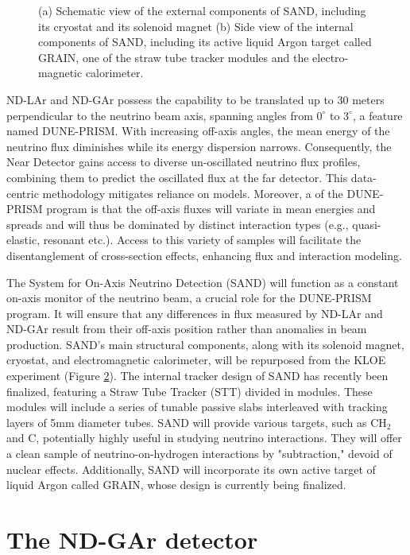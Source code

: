 \begin{figure}[t]
\begin{subfigure}[b]{0.48\textwidth}
         \caption{}
         \label{fig:SAND-inside}
     \end{subfigure}
        \caption{(a) Schematic view of the external components of SAND, including its cryostat and its solenoid magnet (b) Side view of the internal components of SAND, including its active liquid Argon target called GRAIN, one of the straw tube tracker modules and the electro-magnetic calorimeter.  }
        \label{fig:SAND-all}
\end{figure}

ND-LAr and ND-GAr possess the capability to be translated up to 30 meters perpendicular to the neutrino beam axis, spanning angles from $0^{\circ}$ to $3^{\circ}$, a feature named DUNE-PRISM. With increasing off-axis angles, the mean energy of the neutrino flux diminishes while its energy dispersion narrows. Consequently, the Near Detector gains access to diverse un-oscillated neutrino flux profiles, combining them to predict the oscillated flux at the far detector. This data-centric methodology mitigates reliance on models. Moreover, a  of the DUNE-PRISM program is that the off-axis fluxes will variate in mean energies and spreads and will thus be dominated by distinct interaction types (e.g., quasi-elastic, resonant etc.). Access to this variety of samples will facilitate the disentanglement of cross-section effects, enhancing flux and interaction modeling.


The System for On-Axis Neutrino Detection (SAND) will function as a constant on-axis monitor of the neutrino beam, a crucial role for the DUNE-PRISM program. It will ensure that any differences in flux measured by ND-LAr and ND-GAr result from their off-axis position rather than anomalies in beam production. SAND's main structural components, along with its solenoid magnet, cryostat, and electromagnetic calorimeter, will be repurposed from the KLOE experiment (Figure \ref{fig:SAND-all}). The internal tracker design of SAND has recently been finalized, featuring a Straw Tube Tracker (STT) divided in modules. These modules will include a series of tunable passive slabs interleaved with tracking layers of 5mm diameter tubes. SAND will provide various targets, such as CH$_2$ and C, potentially highly useful in studying neutrino interactions. They will offer a clean sample of neutrino-on-hydrogen interactions by "subtraction," devoid of nuclear effects. Additionally, SAND will incorporate its own active target of liquid Argon called GRAIN, whose design is currently being finalized. 

\section{The ND-GAr detector}
\clearpage
